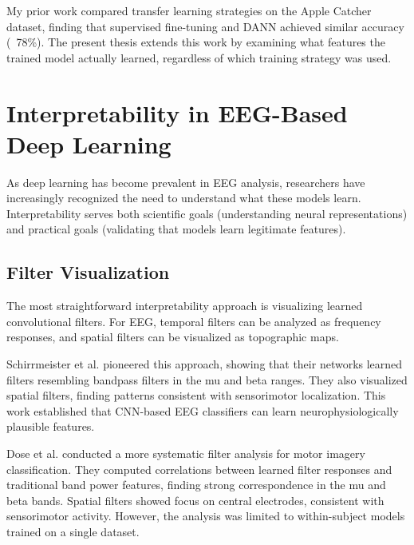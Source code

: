 My prior work \cite{fritzner2025specialization} compared transfer learning strategies on the Apple Catcher dataset, finding that supervised fine-tuning and DANN achieved similar accuracy (~78\%). The present thesis extends this work by examining what features the trained model actually learned, regardless of which training strategy was used.


\section{Interpretability in EEG-Based Deep Learning}
\label{sec:rw_interpretability}

As deep learning has become prevalent in EEG analysis, researchers have increasingly recognized the need to understand what these models learn. Interpretability serves both scientific goals (understanding neural representations) and practical goals (validating that models learn legitimate features).


\subsection{Filter Visualization}
\label{subsec:rw_filter_viz}

The most straightforward interpretability approach is visualizing learned convolutional filters. For EEG, temporal filters can be analyzed as frequency responses, and spatial filters can be visualized as topographic maps.

Schirrmeister et al. \cite{schirrmeister2017deep} pioneered this approach, showing that their networks learned filters resembling bandpass filters in the mu and beta ranges. They also visualized spatial filters, finding patterns consistent with sensorimotor localization. This work established that CNN-based EEG classifiers can learn neurophysiologically plausible features.

Dose et al. \cite{dose2018cnn} conducted a more systematic filter analysis for motor imagery classification. They computed correlations between learned filter responses and traditional band power features, finding strong correspondence in the mu and beta bands. Spatial filters showed focus on central electrodes, consistent with sensorimotor activity. However, the analysis was limited to within-subject models trained on a single dataset.


